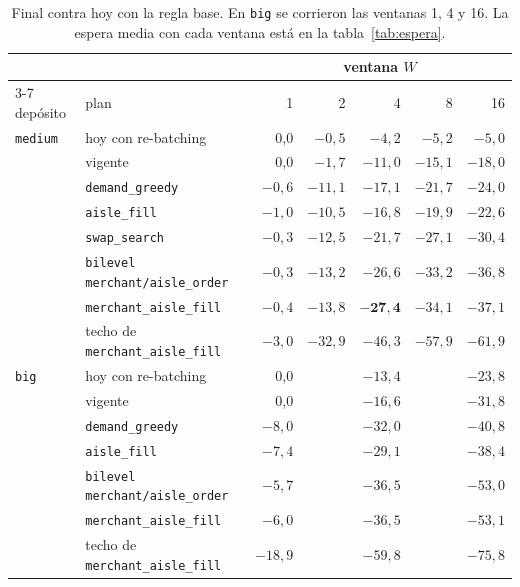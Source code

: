 \documentclass[11pt,a4paper,oneside]{report}
\newcommand{\code}[1]{\texttt{\small #1}}
\begin{document}
\begin{table}[ht]
\centering\small
\begin{tabular}{@{}llrrrrr@{}}
\toprule
 & & \multicolumn{5}{c}{ventana $W$} \\
\cmidrule(l){3-7}
depósito & plan & 1 & 2 & 4 & 8 & 16 \\
\midrule
\code{medium} & hoy con re-batching & 0,0 & $-0{,}5$ & $-4{,}2$ & $-5{,}2$ & $-5{,}0$ \\
 & vigente & 0,0 & $-1{,}7$ & $-11{,}0$ & $-15{,}1$ & $-18{,}0$ \\
 & \code{demand\_greedy} & $-0{,}6$ & $-11{,}1$ & $-17{,}1$ & $-21{,}7$ & $-24{,}0$ \\
 & \code{aisle\_fill} & $-1{,}0$ & $-10{,}5$ & $-16{,}8$ & $-19{,}9$ & $-22{,}6$ \\
 & \code{swap\_search} & $-0{,}3$ & $-12{,}5$ & $-21{,}7$ & $-27{,}1$ & $-30{,}4$ \\
 & \code{bilevel merchant/aisle\_order} & $-0{,}3$ & $-13{,}2$ & $-26{,}6$ & $-33{,}2$ & $-36{,}8$ \\
 & \code{merchant\_aisle\_fill} & $-0{,}4$ & $-13{,}8$ & $\mathbf{-27{,}4}$ & $-34{,}1$ & $-37{,}1$ \\
 & techo de \code{merchant\_aisle\_fill} & $-3{,}0$ & $-32{,}9$ & $-46{,}3$ & $-57{,}9$ & $-61{,}9$ \\
\midrule
\code{big} & hoy con re-batching & 0,0 & & $-13{,}4$ & & $-23{,}8$ \\
 & vigente & 0,0 & & $-16{,}6$ & & $-31{,}8$ \\
 & \code{demand\_greedy} & $-8{,}0$ & & $-32{,}0$ & & $-40{,}8$ \\
 & \code{aisle\_fill} & $-7{,}4$ & & $-29{,}1$ & & $-38{,}4$ \\
 & \code{bilevel merchant/aisle\_order} & $-5{,}7$ & & $-36{,}5$ & & $-53{,}0$ \\
 & \code{merchant\_aisle\_fill} & $-6{,}0$ & & $-36{,}5$ & & $-53{,}1$ \\
 & techo de \code{merchant\_aisle\_fill} & $-18{,}9$ & & $-59{,}8$ & & $-75{,}8$ \\
\bottomrule
\end{tabular}
\caption{Final contra hoy con la regla base. En \code{big} se corrieron las ventanas 1, 4 y 16. La espera media con cada ventana está en la
tabla~\ref{tab:espera}.}
\label{tab:principal}
\end{table}
\end{document}
